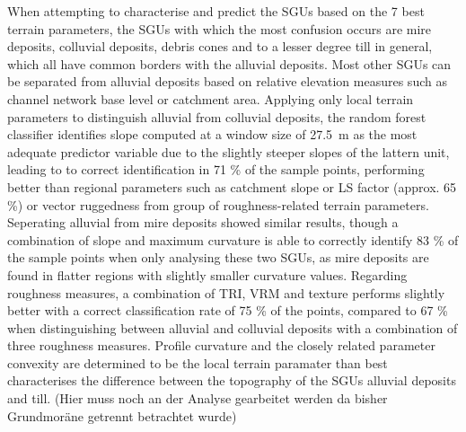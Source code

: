 \documentclass[preprint,12pt,authoryear]{elsarticle}
\begin{document}
When attempting to characterise and predict the SGUs based on the 7 best terrain parameters, the SGUs with which the most confusion occurs are mire deposits, colluvial deposits, debris cones and to a lesser degree till in general, which all have common borders with the alluvial deposits. Most other SGUs can be separated from alluvial deposits based on relative elevation measures such as channel network base level or catchment area. Applying only local terrain parameters to distinguish alluvial from colluvial deposits, the random forest classifier identifies slope computed at a window size of 27.5~m as the most adequate predictor variable due to the slightly steeper slopes of the lattern unit, leading to to correct identification in 71 \% of the sample points, performing better than regional parameters such as catchment slope or LS factor (approx. 65 \%) or vector ruggedness from group of roughness-related terrain parameters. Seperating alluvial from mire deposits showed similar results, though a combination of slope  and maximum curvature is able to correctly identify 83 \% of the sample points when only analysing these two SGUs, as mire deposits are found in flatter regions  with slightly smaller curvature values. Regarding roughness measures, a combination of TRI, VRM and texture performs slightly better with a correct classification rate of 75 \% of the points, compared to  67 \% when distinguishing between alluvial and colluvial deposits with a combination of three roughness measures. Profile curvature and the closely related parameter convexity are determined to be the local terrain paramater than best characterises the difference between the topography of the SGUs alluvial deposits and till. (Hier muss noch an der Analyse gearbeitet werden da bisher Grundmoräne getrennt betrachtet wurde)
\end{document}
